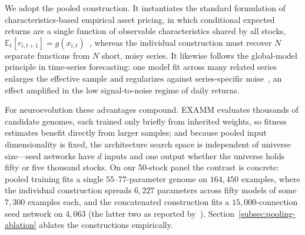 We adopt the pooled construction. It instantiates the standard formulation of characteristics-based empirical asset pricing, in which conditional expected returns are a single function of observable characteristics shared by all stocks, $\mathbb{E}_{t}[r_{i,t+1}]=g(x_{i,t})$~\cite{gu2020empirical}, whereas the individual construction must recover $N$ separate functions from $N$ short, noisy series. It likewise follows the global-model principle in time-series forecasting: one model fit across many related series enlarges the effective sample and regularizes against series-specific noise~\cite{montero2021}, an effect amplified in the low signal-to-noise regime of daily returns.

For neuroevolution these advantages compound. EXAMM evaluates thousands of candidate genomes, each trained only briefly from inherited weights, so fitness estimates benefit directly from larger samples; and because pooled input dimensionality is fixed, the architecture search space is independent of universe size---seed networks have $d$ inputs and one output whether the universe holds fifty or five thousand stocks. On our 50-stock panel the contrast is concrete: pooled training fits a single $55$--$77$-parameter genome on $164{,}450$ examples, where the individual construction spreads $6{,}227$ parameters across fifty models of some $7{,}300$ examples each, and the concatenated construction fits a $15{,}000$-connection seed network on $4{,}063$ (the latter two as reported by~\cite{lyu2025evostar}). Section~\ref{subsec:pooling-ablation} ablates the constructions empirically.

